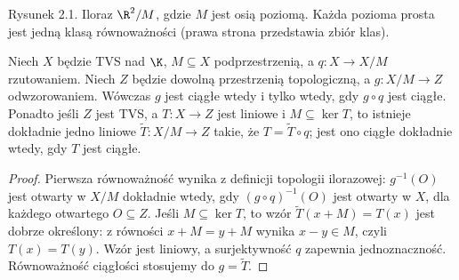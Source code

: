 \begin{center}

{\small Rysunek 2.1. Iloraz $\R^2/M$, gdzie $M$ jest osią poziomą.
Każda pozioma prosta jest jedną klasą równoważności
(prawa strona przedstawia zbiór klas).}
\end{center}

\begin{twierdzenie}\label{thm:quotient-universal}
Niech $X$ będzie TVS nad $\K$, $M\subseteq X$ podprzestrzenią,
a $q:X\to X/M$ rzutowaniem. Niech $Z$ będzie dowolną
przestrzenią topologiczną, a $g:X/M\to Z$ odwzorowaniem.
Wówczas $g$ jest ciągłe wtedy i tylko wtedy,
gdy $g\circ q$ jest ciągłe. Ponadto jeśli $Z$ jest TVS,
a $T:X\to Z$ jest liniowe i $M\subseteq\ker T$, to
istnieje dokładnie jedno liniowe $\widetilde T:X/M\to Z$
takie, że $T=\widetilde T\circ q$; jest ono ciągłe
dokładnie wtedy, gdy $T$ jest ciągłe.
\end{twierdzenie}
\begin{proof}
Pierwsza równoważność wynika z definicji topologii ilorazowej:
$g^{-1}(O)$ jest otwarty w $X/M$ dokładnie wtedy,
gdy $(g\circ q)^{-1}(O)$ jest otwarty w $X$, dla każdego
otwartego $O\subseteq Z$. Jeśli $M\subseteq\ker T$,
to wzór $\widetilde T(x+M)=T(x)$ jest dobrze określony:
z równości $x+M=y+M$ wynika $x-y\in M$, czyli $T(x)=T(y)$.
Wzór jest liniowy, a surjektywność $q$ zapewnia jednoznaczność.
Równoważność ciągłości stosujemy do $g=\widetilde T$.
\end{proof}

